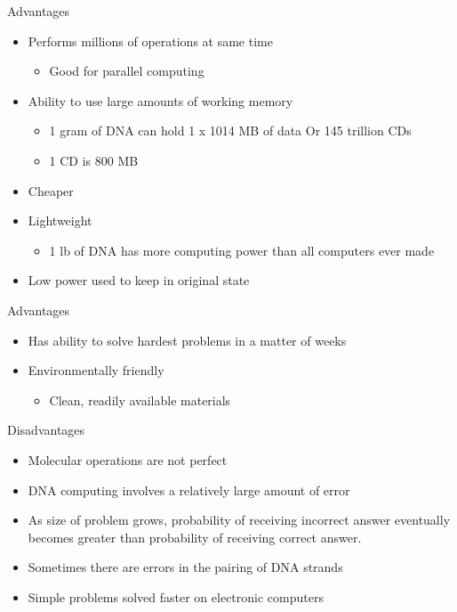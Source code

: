 \documentclass[10pt]{beamer}
\begin{document}
\begin{frame}{Advantages}
  \begin{itemize}
    \item {Performs millions of operations at same time
          \begin{itemize}
        \item{Good for parallel computing}
      \end{itemize}
            }
        \item {Ability to use large amounts of working memory
          \begin{itemize}
        \item{1 gram of DNA can hold 1 x 1014 MB of data Or 145 trillion CDs}
                \item{1 CD is 800 MB}
      \end{itemize}
            }
       
    \item {Cheaper}
        \item {Lightweight
          \begin{itemize}
        \item{1 lb of DNA has more computing power than all computers ever made}
      \end{itemize}
            }
    \item { Low power used to keep in original state}
  \end{itemize}
\end{frame}

\begin{frame}{Advantages}
  \begin{itemize}
    \item {Has ability to solve hardest problems in a matter of weeks}
        \item {Environmentally friendly
          \begin{itemize}
        \item{Clean, readily available materials}
      \end{itemize}
            }
  \end{itemize}
\end{frame}

\begin{frame}{Disadvantages}
  \begin{itemize}
    \item {Molecular operations are not perfect}
    \item {DNA computing involves a relatively large amount of error}
    \item {As size of problem grows, probability of receiving incorrect answer eventually becomes greater than probability of receiving correct answer.}
    \item {Sometimes there are errors in the pairing of DNA strands}
        \item {Simple problems solved faster on electronic computers}
  \end{itemize}
\end{frame}
\end{document}
